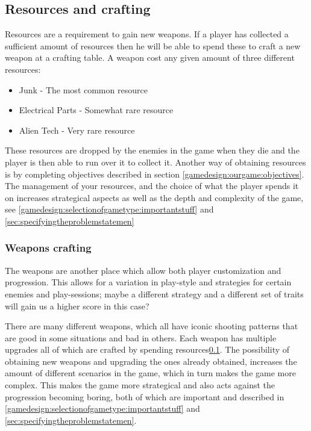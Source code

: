 \subsection{Resources and crafting}\label{gamedesign:ourgame:crafting}
Resources are a requirement to gain new weapons.
If a player has collected a sufficient amount of resources then he will be able to spend these to craft a new weapon at a crafting table.
A weapon cost any given amount of three different resources:
\begin{itemize}
\item Junk - The most common resource
\item Electrical Parts - Somewhat rare resource
\item Alien Tech - Very rare resource
\end{itemize}

These resources are dropped by the enemies in the game when they die and the player is then able to run over it to collect it. Another way of obtaining resources is by completing objectives described in section \ref{gamedesign:ourgame:objectives}. 
The management of your resources, and the choice of what the player spends it on increases strategical aspects as well as the depth and complexity of the game, see \ref{gamedesign:selectionofgametype:importantstuff} and \ref{sec:specifyingtheproblemstatemen}

\subsubsection*{Weapons crafting}\label{gamedesign:ourgame:weapons}
The weapons are another place which allow both player customization and progression. This allows for a variation in play-style and strategies for certain enemies and play-sessions; maybe a different strategy and a different set of traits will gain us a higher score in this case?

There are many different weapons, which all have iconic shooting patterns that are good in some situations and bad in others.
Each weapon has multiple upgrades all of which are crafted by spending resources\ref{gamedesign:ourgame:crafting}. The possibility of obtaining new weapons and upgrading the ones already obtained, increases the amount of different scenarios in the game, which in turn makes the game more complex. This makes the game more strategical and also acts against the progression becoming boring, both of which are important and described in \ref{gamedesign:selectionofgametype:importantstuff} and \ref{sec:specifyingtheproblemstatemen}.

